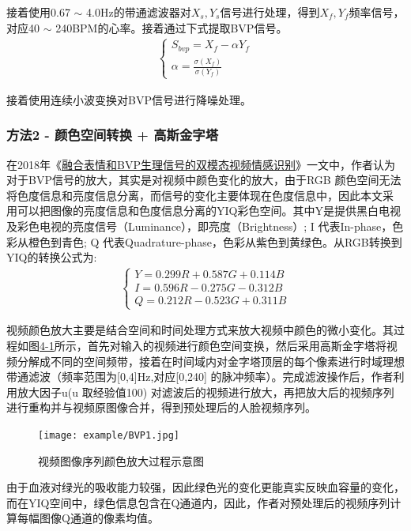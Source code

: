 接着使用0.67 $\sim$ 4.0Hz的带通滤波器对$X_s,Y_s$信号进行处理，得到$X_f, Y_f$频率信号，对应40 $\sim$ 240BPM的心率。接着通过下式提取BVP信号。
\begin{align}
\begin{cases}
S_{bvp} = X_f - \alpha Y_f \\
\alpha = \frac{\sigma(X_f)}{\sigma(Y_f)}
\end{cases}
\end{align}

接着使用连续小波变换对BVP信号进行降噪处理。

\subsubsection{方法2 - 颜色空间转换 + 高斯金字塔}

在2018年《\href{https://xueshu.baidu.com/usercenter/paper/show?paperid=b22a6ba0c40126662ef983f6c530096d&site=xueshu_se&hitarticle=1}{融合表情和BVP生理信号的双模态视频情感识别}》一文中，作者认为对于BVP信号的放大，其实是对视频中颜色变化的放大，由于RGB 颜色空间无法将色度信息和亮度信息分离，而信号的变化主要体现在色度信息中，因此本文采
用可以把图像的亮度信息和色度信息分离的YIQ彩色空间。其中Y是提供黑白电视及彩色电视的亮度信号（Luminance），即亮度（Brightness）; I 代表In-phase，色彩从橙色到青色; Q 代表Quadrature-phase，色彩从紫色到黄绿色。从RGB转换到YIQ的转换公式为:
\begin{align}
\begin{cases}
Y = 0.299R + 0.587G + 0.114B \\
I = 0.596R - 0.275G - 0.312B \\
Q = 0.212R - 0.523G + 0.311B
\end{cases}
\end{align}

视频颜色放大主要是结合空间和时间处理方式来放大视频中颜色的微小变化。其过程如图\href{fig1:4-1}{4-1}所示，首先对输入的视频进行颜色空间变换，然后采用高斯金字塔将视频分解成不同的空间频带，接着在时间域内对金字塔顶层的每个像素进行时域理想带通滤波（频率范围为[0,4]Hz,对应[0,240] 的脉冲频率）。完成滤波操作后，作者利用放大因子u(u 取经验值100) 对滤波后的视频进行放大，再把放大后的视频序列进行重构并与视频原图像合并，得到预处理后的人脸视频序列。

\begin{figure}[!htp]
\centering
\texttt{[image: example/BVP1.jpg]}
\caption{视频图像序列颜色放大过程示意图}
\label{fig1:4-1}
\end{figure}

由于血液对绿光的吸收能力较强，因此绿色光的变化更能真实反映血容量的变化，而在YIQ空间中，绿色信息包含在Q通道内，因此，作者对预处理后的视频序列计算每幅图像Q通道的像素均值。

